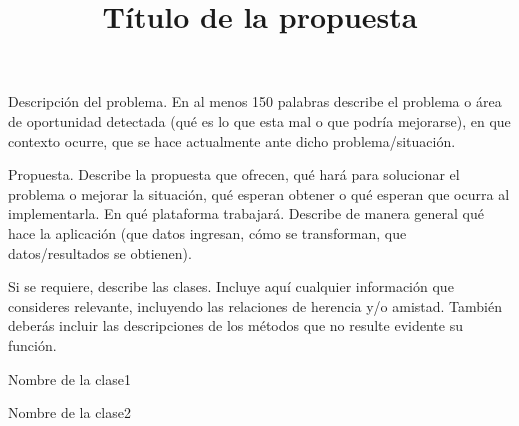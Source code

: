 \documentclass{PIA}
\begin{document}


\title{Título de la propuesta}


\autores[Autor1][Autor2][Autor3][Autor4][Autor5][Autor6] %

\descripcionproblema
{
	Descripción del problema. En al menos 150 palabras describe el problema o área de oportunidad detectada (qué es lo que esta mal o que podría mejorarse), en que contexto ocurre, que se hace actualmente ante dicho problema/situación.
}

\descripcionpropuesta
{
	Propuesta. Describe la propuesta que ofrecen, qué hará para solucionar el problema o mejorar la situación, qué esperan obtener o qué esperan que ocurra al implementarla. En qué plataforma trabajará. Describe de manera general qué hace la aplicación (que datos ingresan, cómo se transforman, que datos/resultados se obtienen).
}

\descripcionclases
{
	Si se requiere, describe las clases. Incluye aquí cualquier información que consideres relevante, incluyendo las relaciones de herencia y/o amistad. También deberás incluir las descripciones de los métodos que no resulte evidente su función.
}


\primerclase
{
	\begin{clase}{Nombre de la clase1}
			\hline
	\end{clase}
}

\segundaclase
{
	\begin{clase}{Nombre de la clase2}
			\hline
	\end{clase}
}
\end{document}
